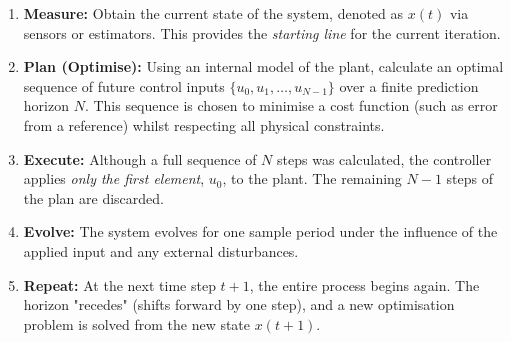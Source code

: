 \begin{enumerate}
	\item \textbf{Measure:} Obtain the current state of the system, denoted as $x(t)$ via sensors or estimators. This provides the \emph{starting line} for the current iteration.
	\item \textbf{Plan (Optimise):} Using an internal model of the plant, calculate an optimal sequence of future control inputs $\{u_0, u_1, \dots, u_{N-1}\}$ over a finite prediction horizon $N$. This sequence is chosen to minimise a cost function (such as error from a reference) whilst respecting all physical constraints.
	
	\item \textbf{Execute:} Although a full sequence of $N$ steps was calculated, the controller applies \emph{only the first element}, $u_0$, to the plant. The remaining $N-1$ steps of the plan are discarded.
	\item \textbf{Evolve:} The system evolves for one sample period under the influence of the applied input and any external disturbances.
	\item \textbf{Repeat:} At the next time step $t+1$, the entire process begins again. The horizon "recedes" (shifts forward by one step), and a new optimisation problem is solved from the new state 	$x(t+1)$.
\end{enumerate}

